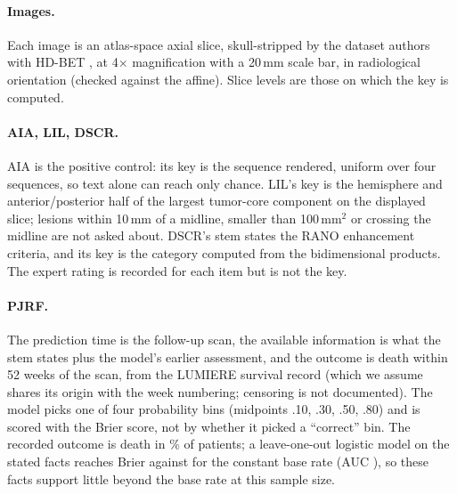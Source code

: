 \documentclass[11pt]{article}
\begin{document}
\paragraph{Images.} Each image is an atlas-space axial slice, skull-stripped by the dataset authors with HD-BET \citep{isensee2019automated}, at 4$\times$ magnification with a 20\,mm scale bar, in radiological orientation (checked against the affine). Slice levels are those on which the key is computed.

\paragraph{AIA, LIL, DSCR.} AIA is the positive control: its key is the sequence rendered, uniform over four sequences, so text alone can reach only chance. LIL's key is the hemisphere and anterior/posterior half of the largest tumor-core component on the displayed slice; lesions within 10\,mm of a midline, smaller than 100\,mm$^2$ or crossing the midline are not asked about. DSCR's stem states the RANO enhancement criteria, and its key is the category computed from the bidimensional products. The expert rating is recorded for each item but is not the key.

\paragraph{PJRF.} The prediction time is the follow-up scan, the available information is what the stem states plus the model's earlier assessment, and the outcome is death within 52 weeks of the scan, from the LUMIERE survival record (which we assume shares its origin with the week numbering; censoring is not documented). The model picks one of four probability bins (midpoints .10, .30, .50, .80) and is scored with the Brier score, not by whether it picked a ``correct'' bin. The recorded outcome is death in \vfourPjrfBase{}\% of \vfourPjrfN{} patients; a leave-one-out logistic model on the stated facts reaches Brier \vfourPjrfBrierLR{} against \vfourPjrfBrierBase{} for the constant base rate (AUC \vfourPjrfAucLR{}), so these facts support little beyond the base rate at this sample size.
\end{document}
